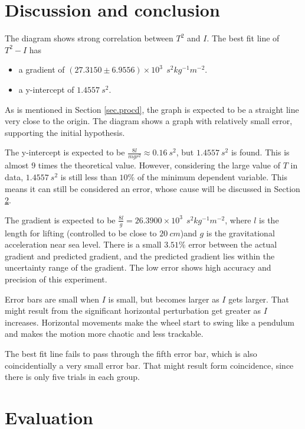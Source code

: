 \documentclass[a4paper]{article}
\begin{document}
\section{Discussion and conclusion}

\label{sec.discussion}

The diagram shows strong correlation between $T^2$ and $I$. The best fit line of $T^2 - I$ has 

\begin{itemize}
    \item a gradient of $(27.3150 \pm 6.9556) \times 10^3\ \SI{}{s^2kg^{-1}m^{-2}}$.
    \item a y-intercept of $1.4557 \SI{}{s^2}$.
\end{itemize}

As is mentioned in Section \ref{sec.procd}, the graph is expected to be a straight line very close to the origin. The diagram shows a graph with relatively small error, supporting the initial hypothesis.

The y-intercept is expected to be $\frac{8l}{mgr^2} \approx 0.16\SI{}{s^2}$, but $1.4557\SI{}{s^2}$ is found. This is almost $9$ times the theoretical value. However, considering the large value of $T$ in data, $1.4557\SI{}{s^2}$ is still less than $10\%$ of the minimum dependent variable. This means it can still be considered an error, whose cause will be discussed in Section \ref{sec.eval}.

The gradient is expected to be $\frac{8l}{g} = 26.3900 \times 10^3\ \SI{}{s^2kg^{-1}m^{-2}}$, where $l$ is the length for lifting (controlled to be close to $\SI{20}{cm}$)and $g$ is the gravitational acceleration near sea level. There is a small $3.51\%$ error between the actual gradient and predicted gradient, and the predicted gradient lies within the uncertainty range of the gradient. The low error shows high accuracy and precision of this experiment.

Error bars are small when $I$ is small, but becomes larger as $I$ gets larger. That might result from the significant horizontal perturbation get greater as $I$ increases. Horizontal movements make the wheel start to swing like a pendulum and makes the motion more chaotic and less trackable. 

The best fit line fails to pass through the fifth error bar, which is also coincidentially a very small error bar. That might result form coincidence, since there is only five trials in each group.

\section{Evaluation}
\label{sec.eval}
\end{document}
